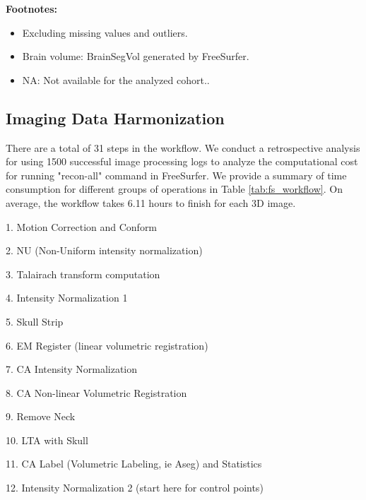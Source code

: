 \documentclass[pdflatex,sn-nature]{sn-jnl}%
\newif\ifhighlight
\newcommand{\rev}[1]{\ifhighlight{\color{blue}{}#1}\else#1\fi}%
\theoremstyle{thmstyleone}%
\theoremstyle{thmstyletwo}%
\theoremstyle{thmstylethree}%
\begin{document}
\begin{appendices}
\begin{table}[h!]
\begin{minipage}{\textwidth}
    \footnotesize
    \textbf{Footnotes:}
    \begin{itemize}
        \item Excluding missing values and outliers.
        \item Brain volume: BrainSegVol generated by FreeSurfer.
        \item NA: Not available for the analyzed cohort..
    \end{itemize}
\end{minipage}

\caption{Dataset distribution in BrainATLAS. We include a total of 18 distinct neuroimaging dataset from diverse populations.\rev{ $^{\dagger}$ATLAS R2.0 contains one scan per participant, acquired at 33 sites.}}
\label{tab:BrainATLAS_datasets}
\end{table}

\clearpage
\subsection{Imaging Data Harmonization}
\label{sec_app:image_data_harmonization}

There are a total of 31 steps in the workflow. We conduct a retrospective analysis for using 1500 successful image processing logs to analyze the computational cost for running "recon-all" command in FreeSurfer. We provide a summary of time consumption for different groups of operations in Table \ref{tab:fs_workflow}. On average, the workflow takes 6.11 hours to finish for each 3D image.

1. Motion Correction and Conform

2. NU (Non-Uniform intensity normalization)

3. Talairach transform computation

4. Intensity Normalization 1

5. Skull Strip

6. EM Register (linear volumetric registration)

7. CA Intensity Normalization

8. CA Non-linear Volumetric Registration

9. Remove Neck

10. LTA with Skull

11. CA Label (Volumetric Labeling, ie Aseg) and Statistics

12. Intensity Normalization 2 (start here for control points)


\end{appendices}
\end{document}
